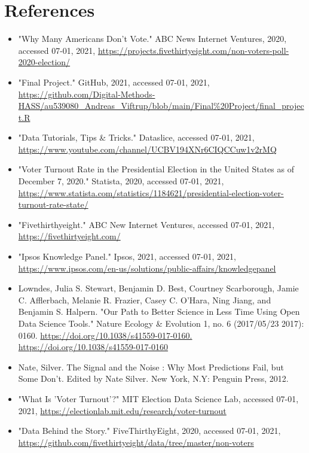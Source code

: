 \documentclass{article}
\begin{document}
\section{References}
\begin{itemize}

    \item "Why Many Americans Don't Vote." ABC News Internet Ventures, 2020, accessed 07-01, 2021, \url{https://projects.fivethirtyeight.com/non-voters-poll-2020-election/}
    \item "Final Project." GitHub, 2021, accessed 07-01, 2021, \url{https://github.com/Digital-Methods-HASS/au539080_Andreas_Viftrup/blob/main/Final%20Project/final_project.R}
        \item "Data Tutorials, Tips & Tricks." Dataslice, accessed 07-01, 2021, \url{https://www.youtube.com/channel/UCBV194XNr6CIQCCuw1v2rMQ}
    \item "Voter Turnout Rate in the Presidential Election in the United States as of December 7, 2020." Statista, 2020, accessed 07-01, 2021, \url{https://www.statista.com/statistics/1184621/presidential-election-voter-turnout-rate-state/}
    \item "Fivethirthyeight." ABC New Internet Ventures, accessed 07-01, 2021, 
    \url{ https://fivethirtyeight.com/}
    \item "Ipsos Knowledge Panel." Ipsos, 2021, accessed 07-01, 2021, \url{https://www.ipsos.com/en-us/solutions/public-affairs/knowledgepanel}
    \item Lowndes, Julia S. Stewart, Benjamin D. Best, Courtney Scarborough, Jamie C. Afflerbach, Melanie R. Frazier, Casey C. O’Hara, Ning Jiang, and Benjamin S. Halpern. "Our Path to Better Science in Less Time Using Open Data Science Tools." Nature Ecology & Evolution 1, no. 6 (2017/05/23 2017): 0160. \url{https://doi.org/10.1038/s41559-017-0160. https://doi.org/10.1038/s41559-017-0160}
    \item Nate, Silver. The Signal and the Noise : Why Most Predictions Fail, but Some Don't. Edited by Nate Silver. New York, N.Y: Penguin Press, 2012.
    \item "What Is 'Voter Turnout'?" MIT Election Data Science Lab, accessed 07-01, 2021, \url{https://electionlab.mit.edu/research/voter-turnout}
    \item "Data Behind the Story." FiveThirthyEight, 2020, accessed 07-01, 2021, \url{https://github.com/fivethirtyeight/data/tree/master/non-voters}
    
\end{itemize}
\pagebreak
\end{document}
